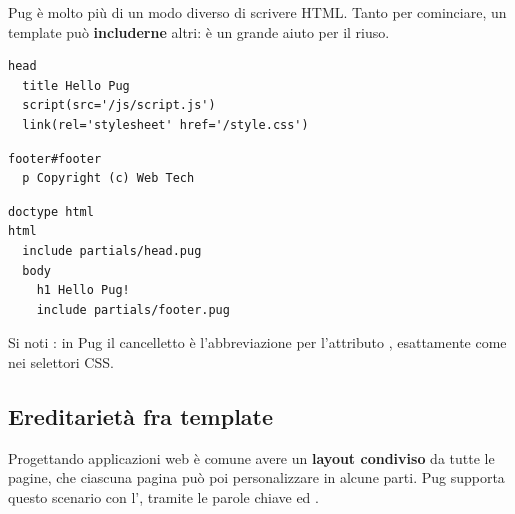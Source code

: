 Pug è molto più di un modo diverso di scrivere HTML. Tanto per cominciare, un
template può \textbf{includerne} altri: è un grande aiuto per il riuso.

\begin{lstlisting}[style=pug, name=partials/head.pug]
head
  title Hello Pug
  script(src='/js/script.js')
  link(rel='stylesheet' href='/style.css')
\end{lstlisting}

\begin{lstlisting}[style=pug, name=partials/footer.pug]
footer#footer
  p Copyright (c) Web Tech
\end{lstlisting}

\begin{lstlisting}[style=pug, name=index.pug]
doctype html
html
  include partials/head.pug
  body
    h1 Hello Pug!
    include partials/footer.pug
\end{lstlisting}

Si noti : in Pug il cancelletto è l'abbreviazione per
l'attributo , esattamente come nei selettori CSS.

\subsection{Ereditarietà fra template}

Progettando applicazioni web è comune avere un \textbf{layout condiviso} da
tutte le pagine, che ciascuna pagina può poi personalizzare in alcune parti. Pug
supporta questo scenario con l', tramite le
parole chiave  ed .

